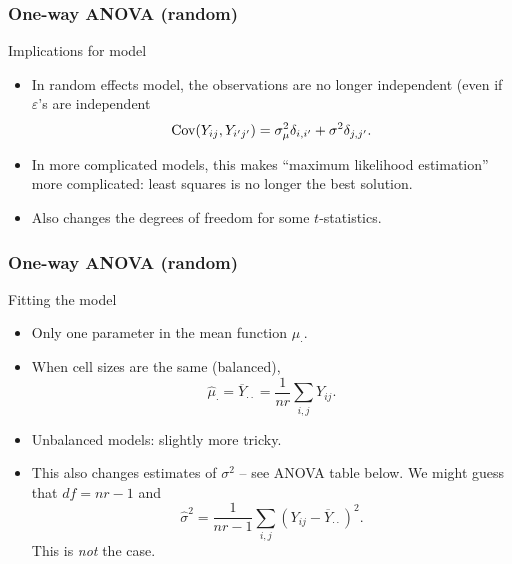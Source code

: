 \documentclass[handout]{beamer}
\begin{document}

   \begin{frame} \frametitle{One-way ANOVA (random)}

   \begin{block}
   {Implications for model}
   \begin{itemize}

   \item In random effects model, the observations are no longer independent (even if $\varepsilon$'s are independent
   $$
   {\rm Cov}(Y_{ij}, Y_{i'j'}) = \sigma^2_{\mu} \delta_{i,i'} + \sigma^2 \delta_{j,j'}.$$

   \item In more complicated models, this makes ``maximum likelihood estimation'' more complicated: least squares is no longer the best solution.


   \item Also changes the degrees of freedom for some $t$-statistics.
   \end{itemize}
   \end{block}
   \end{frame}


   \begin{frame} \frametitle{One-way ANOVA (random)}

   \begin{block}
   {Fitting the model}
   \begin{itemize}
   \item Only one parameter in the mean function $\mu_{\cdot}.$

   \item When cell sizes are the same (balanced),
   $$
   \widehat{\mu}_{\cdot} = \overline{Y}_{\cdot \cdot} = \frac{1}{nr} \sum_{i,j} Y_{ij}.$$

   \item Unbalanced models: slightly more tricky.

   \item This also changes estimates of $\sigma^2$ -- see ANOVA table below. We might guess that $df=nr-1$ and
   $$
   \widehat{\sigma}^2 = \frac{1}{nr-1} \sum_{i,j} (Y_{ij} - \overline{Y}_{\cdot\cdot})^2.$$
   This is {\em not} the case.
   \end{itemize}
   \end{block}
   \end{frame}
\end{document}
